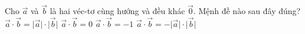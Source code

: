 
\begin{ex}%
	Cho $\overrightarrow{a} $ và $\overrightarrow{b} $ là hai véc-tơ cùng hướng và đều khác $\overrightarrow{0} $. Mệnh đề nào sau đây đúng?
	\choice
	{\True $\overrightarrow{a} \cdot \overrightarrow{b}=\big| \overrightarrow{a}\big| \cdot \big| \overrightarrow{b}\big| $}
	{$\overrightarrow{a} \cdot \overrightarrow{b}=0$}
	{$\overrightarrow{a} \cdot \overrightarrow{b}=-1$}
	{$\overrightarrow{a} \cdot \overrightarrow{b}=-\big| \overrightarrow{a}\big| \cdot \big| \overrightarrow{b}\big| $}
\end{ex}

